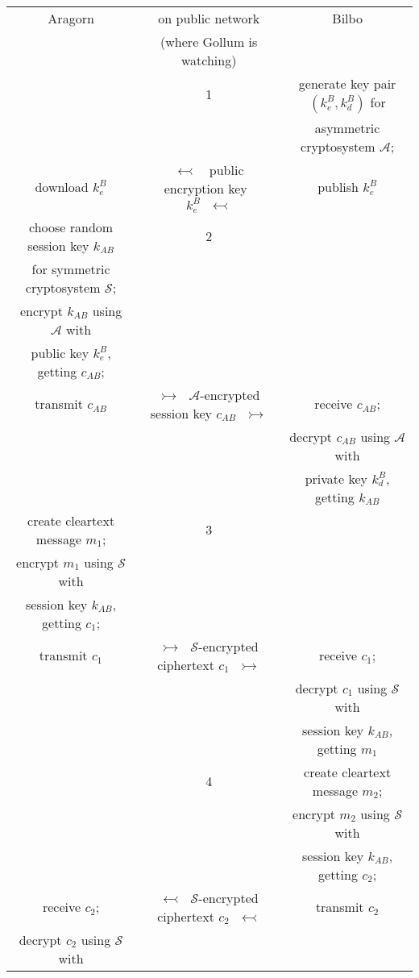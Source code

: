 \documentclass[12pt,letterpaper]{amsbook}
\theoremstyle{definition}
\theoremstyle{remark}
\numberwithin{figure}{section}
\numberwithin{exercise}{chapter}
\numberwithin{section}{chapter}
\numberwithin{equation}{section}
\numberwithin{table}{subsection}
\newcommand{\Aa}{{\mathcal A}}
\newcommand{\Ss}{{\mathcal S}}
\begin{document}
\ \vskip4mm
\begin{adjustbox}{center}
  \begin{tabular}{|c|c|c|}
    \hline
    Aragorn & on public network & Bilbo\\
    & (where Gollum is watching) & \\
    \hline
    & \textcircled{\tiny{1}} & generate key pair $(k^B_e,k^B_d)$ for\\
    & & asymmetric cryptosystem $\Aa$;\\
    download $k^B_e$ & $\leftarrowtail\ \ \ $ public encryption key\index{encryption key [for an asymmetric cryptosystem]}\index{public key}\index{key!public}\index{key!encryption [for an asymmetric cryptosystem]}\ $k^B_e\ \ \ \leftarrowtail$ & publish $k^B_e$\\
    \hline
    choose random session key $k_{AB}$ & \textcircled{\tiny{2}} & \\
    for symmetric cryptosystem $\Ss$; & & \\
    encrypt $k_{AB}$ using $\Aa$ with & & \\
    public key $k^B_e$, getting $c_{AB}$; & & \\
    transmit $c_{AB}$ & $\rightarrowtail\ \ \ \Aa$-encrypted session key $c_{AB}\ \ \ \rightarrowtail$ & receive $c_{AB}$;\\
    & & decrypt $c_{AB}$ using $\Aa$ with\\
    & & private key $k^B_d$, getting $k_{AB}$\\
    \hline
    create cleartext message $m_1$;& \textcircled{\tiny{3}} & \\
    encrypt $m_1$ using $\Ss$ with & & \\
    session key $k_{AB}$, getting $c_1$; & & \\
    transmit $c_1$ & $\rightarrowtail\ \ \ \Ss$-encrypted ciphertext  $c_1\ \ \ \rightarrowtail$ & receive $c_1$;\\
     & & decrypt $c_1$ using $\Ss$ with \\
     & & session key $k_{AB}$, getting $m_1$\\
    \hline
    & \textcircled{\tiny{4}} & create cleartext message $m_2$;\\
    & & encrypt $m_2$ using $\Ss$ with \\
    & & session key $k_{AB}$, getting $c_2$; \\
    receive $c_2$; & $\leftarrowtail\ \ \ \Ss$-encrypted ciphertext $c_2\ \ \ \leftarrowtail$ & transmit $c_2$\\
    decrypt $c_2$ using $\Ss$ with & & \\

\end{tabular}
\end{adjustbox}
\end{document}
